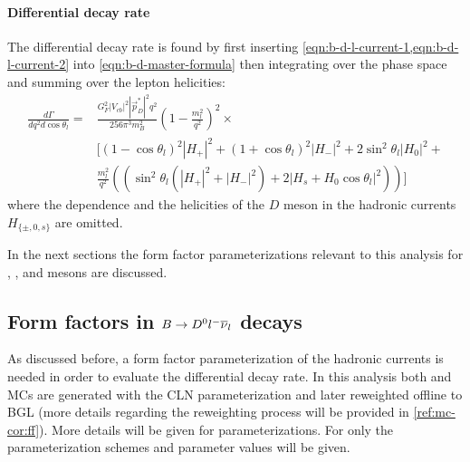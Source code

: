 \paragraph{Differential decay rate}
The differential decay rate is found by first inserting
\cref{eqn:b-d-l-current-1,eqn:b-d-l-current-2}
into \cref{eqn:b-d-master-formula} then integrating over the phase space and
summing over the lepton helicities:
\begin{align}
    \frac{d\Gamma}{d q^2 d\cos\theta_l} =&
    \frac{G^2_F |V_{cb}|^2 | \vec{p}^*_D|^2 q^2}{256 \pi^3 m^2_B}
    \left(1 - \frac{m^2_l}{q^2}\right)^2 \times
    \nonumber \\
    &\bigg[
        (1 - \cos\theta_l)^2 |H_+|^2 + (1 + \cos\theta_l)^2 |H_-|^2 +
        2 \sin^2\theta_l |H_0|^2 +
    \nonumber \\
    & \frac{m^2_l}{q^2} \left(
        (\sin^2\theta_l(|H_+|^2 + |H_-|^2) + 2|H_s + H_0 \cos\theta_l|^2)
    \right)
    \bigg]
    \label{eqn:ff-ps}
\end{align}
where the \qSq dependence and the helicities of the $D$ meson in the hadronic
currents $H_{\{\pm,0,s\}}$ are omitted.

In the next sections the form factor parameterizations relevant to this analysis
for \Dz, \Dstar, and \Dstst mesons are discussed.


\subsection{Form factors in $B \rightarrow {\ensuremath{{D}^0}}{\ensuremath{l^-}}{\ensuremath{{\overline{\nu}}_l}}$ decays}
\label{ref:theory:ff-d0}

As discussed before,
a form factor parameterization of the hadronic currents is needed in order to
evaluate the differential decay rate.
In this analysis both \Dz and \Dstar MCs are generated with the CLN
parameterization and later reweighted offline to BGL
(more details regarding the reweighting process will be provided in
\cref{ref:mc-cor:ff}).
More details will be given for \Dz parameterizations.
For \Dstar only the parameterization schemes and parameter values will be given.

